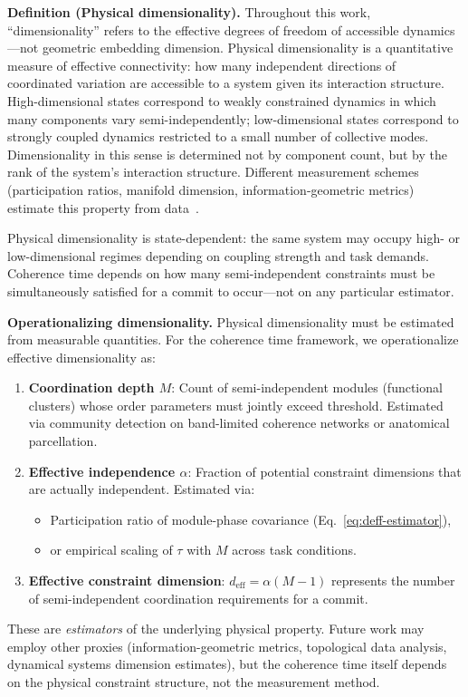 \documentclass[12pt]{article}
\begin{document}
\textbf{Definition (Physical dimensionality).} Throughout this work, ``dimensionality'' refers to the effective degrees of freedom of accessible dynamics---not geometric embedding dimension. Physical dimensionality is a quantitative measure of effective connectivity: how many independent directions of coordinated variation are accessible to a system given its interaction structure. High-dimensional states correspond to weakly constrained dynamics in which many components vary semi-independently; low-dimensional states correspond to strongly coupled dynamics restricted to a small number of collective modes. Dimensionality in this sense is determined not by component count, but by the rank of the system's interaction structure. Different measurement schemes (participation ratios, manifold dimension, information-geometric metrics) estimate this property from data~\cite{amari2016}.

Physical dimensionality is state-dependent: the same system may occupy high- or low-dimensional regimes depending on coupling strength and task demands. Coherence time depends on how many semi-independent constraints must be simultaneously satisfied for a commit to occur---not on any particular estimator.

\textbf{Operationalizing dimensionality.} Physical dimensionality must be estimated from measurable quantities. For the coherence time framework, we operationalize effective dimensionality as:
\begin{enumerate}
\item \textbf{Coordination depth $M$}: Count of semi-independent modules (functional clusters) whose order parameters must jointly exceed threshold. Estimated via community detection on band-limited coherence networks or anatomical parcellation.
\item \textbf{Effective independence $\alpha$}: Fraction of potential constraint dimensions that are actually independent. Estimated via:
\begin{itemize}
\item Participation ratio of module-phase covariance (Eq.~\ref{eq:deff-estimator}),
\item or empirical scaling of $\tau$ with $M$ across task conditions.
\end{itemize}
\item \textbf{Effective constraint dimension}: $d_{\mathrm{eff}} = \alpha(M-1)$ represents the number of semi-independent coordination requirements for a commit.
\end{enumerate}
These are \emph{estimators} of the underlying physical property. Future work may employ other proxies (information-geometric metrics, topological data analysis, dynamical systems dimension estimates), but the coherence time itself depends on the physical constraint structure, not the measurement method.
\end{document}
